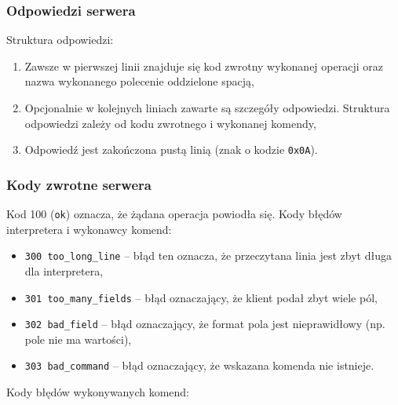 \documentclass[10pt,a4paper]{article}
\begin{document}
\subsubsection{Odpowiedzi serwera}
\noindent Struktura odpowiedzi:
\begin{enumerate}
    \item Zawsze w pierwszej linii znajduje się kod zwrotny wykonanej operacji oraz nazwa wykonanego polecenie oddzielone spacją,
    \item Opcjonalnie w kolejnych liniach zawarte są szczegóły odpowiedzi. Struktura odpowiedzi zależy od kodu zwrotnego i wykonanej komendy,
    \item Odpowiedź jest zakończona pustą linią (znak o kodzie \texttt{0x0A}).
\end{enumerate}

\subsubsection{Kody zwrotne serwera}
\noindent Kod 100 (\texttt{ok}) oznacza, że żądana operacja powiodła się.
\noindent Kody błędów interpretera i wykonawcy komend:
\begin{itemize}
    \item \texttt{300 too\_long\_line} -- błąd ten oznacza, że przeczytana linia jest zbyt długa dla interpretera,
    \item \texttt{301 too\_many\_fields} -- błąd oznaczający, że klient podał zbyt wiele pól,
    \item \texttt{302 bad\_field} -- błąd oznaczający, że format pola jest nieprawidłowy (np. pole nie ma wartości),
    \item \texttt{303 bad\_command} -- błąd oznaczający, że wskazana komenda nie istnieje.
\end{itemize}
\noindent Kody błędów wykonywanych komend:
\end{document}

